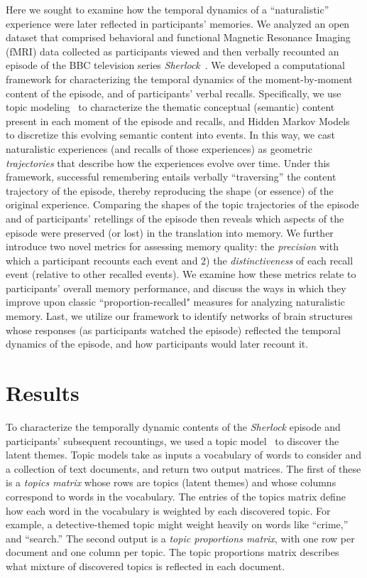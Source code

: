\documentclass{article}
\begin{document}
Here we sought to examine how the temporal dynamics of a ``naturalistic'' experience were later reflected in participants' memories.  We analyzed an open dataset that comprised behavioral and functional Magnetic Resonance Imaging (fMRI) data collected as participants viewed and then verbally recounted an episode of the BBC television series \textit{Sherlock}~\citep{ChenEtal17}.  We developed a computational framework for characterizing the temporal dynamics of the moment-by-moment content of the episode, and of participants' verbal recalls.  Specifically, we use topic modeling~\citep{BleiEtal03} to characterize the thematic conceptual (semantic) content present in each moment of the episode and recalls, and Hidden Markov Models~\citep{Rabi89, BaldEtal17} to discretize this evolving semantic content into events.  In this way, we cast naturalistic experiences (and recalls of those experiences) as geometric \textit{trajectories} that describe how the experiences evolve over time. Under this framework, successful remembering entails verbally ``traversing'' the content trajectory of the episode, thereby reproducing the shape (or essence) of the original experience.  Comparing the shapes of the topic trajectories of the episode and of participants' retellings of the episode then reveals which aspects of the episode were preserved (or lost) in the translation into memory.  We further introduce two novel metrics for assessing memory quality: the \textit{precision} with which a participant recounts each event and 2) the \textit{distinctiveness} of each recall event (relative to other recalled events).  We examine how these metrics relate to participants' overall memory performance, and discuss the ways in which they improve upon classic ``proportion-recalled" measures for analyzing naturalistic memory.  Last, we utilize our framework to identify networks of brain structures whose responses (as participants watched the episode) reflected the temporal dynamics of the episode, and how participants would later recount it.


\section*{Results}
To characterize the temporally dynamic contents of the \textit{Sherlock} episode and participants' subsequent recountings, we used a topic model~\citep{BleiEtal03} to discover the latent themes.  Topic models take as inputs a vocabulary of words to consider and a collection of text documents, and return two output matrices.  The first of these is a \textit{topics matrix} whose rows are topics (latent themes) and whose columns correspond to words in the vocabulary. The entries of the topics matrix define how each word in the vocabulary is weighted by each discovered topic.  For example, a detective-themed topic might weight heavily on words like ``crime,'' and ``search.''  The second output is a \textit{topic proportions matrix}, with one row per document and one column per topic.  The topic proportions matrix describes what mixture of discovered topics is reflected in each document.
\end{document}
